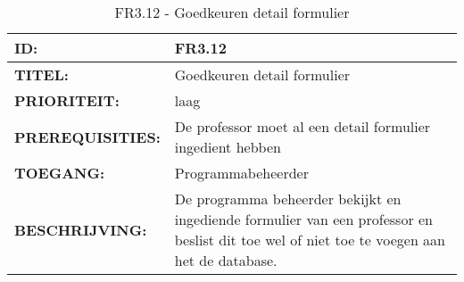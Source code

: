 \noindent\begin{table}[H]
            \begin{tabular}{l | p{10cm}}
                \textbf{ID:} & FR3.12 \\ \hline
                \textbf{TITEL:} & Goedkeuren detail formulier   \\ \hline
                \textbf{PRIORITEIT:} &  laag \\ \hline
                \textbf{PREREQUISITIES:} & De professor moet al een detail formulier ingedient hebben\\ \hline
                \textbf{TOEGANG:} & Programmabeheerder \\ \hline
                \textbf{BESCHRIJVING:} & De programma beheerder bekijkt en ingediende formulier van een professor en beslist dit toe wel of niet toe te voegen aan het de database. 
            \end{tabular}\\
            \caption{FR3.12 - Goedkeuren detail formulier  }
            \label{tab:FR3.12 - Goedkeuren detail formulier  }
        \end{table}

